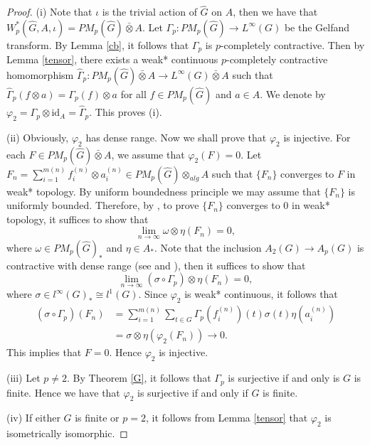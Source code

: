 \documentclass[reqno,11pt]{amsart}
\theoremstyle{plain}
\theoremstyle{definition}
\theoremstyle{remark}
\begin{document}
\begin{proof}
(i) Note that $\iota$ is the trivial action of $\hat{G}$ on $A$, then we have that $W^*_p(\hat{G},A,\iota)=PM_p(\hat{G})\bar{\otimes} A$.
Let $\Gamma_p:PM_p(\hat{G})\rightarrow L^\infty(G)$ be the Gelfand transform. By Lemma \ref{cb}, it follows that $\Gamma_p$ is $p$-completely contractive. Then by Lemma \ref{tensor}, there exists a weak* continuous $p$-completely contractive homomorphism $\hat{\Gamma}_p:PM_p(\hat{G})\bar{\otimes}A\rightarrow L^\infty(G)\bar{\otimes}A$ such that $\hat{\Gamma}_p(f\otimes a)=\Gamma_p(f)\otimes a$ for all $f\in PM_p(\hat{G})$ and $a\in A$. We denote by $\varphi_2=\Gamma_p\otimes \mathrm{id}_A=\hat{\Gamma}_p$. This proves (i).



(ii) Obviously, $\varphi_2$ has dense range.
Now we shall prove that $\varphi_2$ is injective.
For each $F\in PM_p(\hat{G})\bar{\otimes}A$, we assume that $\varphi_2(F)=0$. Let $F_n=\sum_{i=1}^{m(n)}f_i^{(n)}\otimes a_i^{(n)}\in PM_p(\hat{G})\otimes_{alg}A$ such that $\{F_n\}$ converges to $F$ in weak* topology. By uniform boundedness principle we may assume that $\{F_n\}$ is uniformly bounded. Therefore, by \cite[Theorem 6.3]{Daws1}, to prove $\{F_n\}$ converges to $0$ in weak* topology, it suffices to show that $$\lim_{n\rightarrow \infty}\omega\otimes\eta(F_n)=0,$$ where $\omega\in PM_p(\hat{G})_*$ and $\eta\in A_*$.
Note that the inclusion $A_2(G)\rightarrow A_p(G)$ is contractive with dense range (see \cite[Theorem C]{Herz} and \cite[Proposition 1.1]{Runde}),
then it suffices to show that $$\lim_{n\rightarrow \infty}(\sigma\circ\Gamma_p)\otimes\eta(F_n)=0,$$ where $\sigma\in l^\infty(G)_*\cong l^1(G)$.
Since $\varphi_2$ is weak* continuous, it follows that
$$\begin{aligned} (\sigma\circ\Gamma_p)(F_n) &=
\sum_{i=1}^{m(n)}\sum_{t\in G}\Gamma_p(f_i^{(n)})(t)\sigma(t)\eta(a_i^{(n)})\\
 &=\sigma\otimes\eta(\varphi_2(F_n))\rightarrow 0. \end{aligned}$$
This implies that $F=0$. Hence $\varphi_2$ is injective.

(iii) Let $p\neq 2$. By Theorem \ref{G},  it follows that $\Gamma_p$ is surjective if and only is $G$ is finite. Hence we have that $\varphi_2$ is surjective if and only if $G$ is finite.

(iv) If either $G$ is finite or $p=2$, it follows from Lemma \ref{tensor} that $\varphi_2$ is isometrically isomorphic.


\end{proof}
\end{document}
